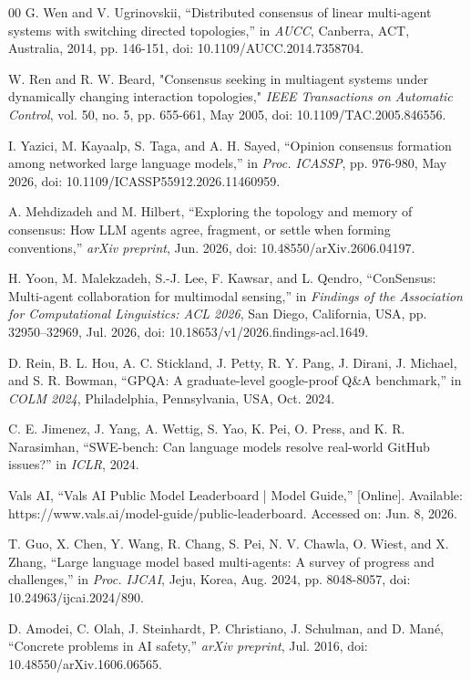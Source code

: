 \documentclass[journal,twoside,web]{ieeecolor_no_firstpage_logo}
\begin{document}
\begin{thebibliography}{00}
 G. Wen and V. Ugrinovskii, “Distributed consensus of linear multi-agent systems with switching directed topologies,” in \textit{AUCC}, Canberra, ACT, Australia, 2014, pp. 146-151, doi: 10.1109/AUCC.2014.7358704.

 W. Ren and R. W. Beard, "Consensus seeking in multiagent systems under dynamically changing interaction topologies," \textit{IEEE Transactions on Automatic Control}, vol. 50, no. 5, pp. 655-661, May 2005, doi: 10.1109/TAC.2005.846556. 

 I. Yazici, M. Kayaalp, S. Taga, and A. H. Sayed, “Opinion consensus formation among networked large language models,” in \textit{Proc. ICASSP}, pp. 976-980, May 2026, doi: 10.1109/ICASSP55912.2026.11460959. 

 A. Mehdizadeh and M. Hilbert, “Exploring the topology and memory of consensus: How LLM agents agree, fragment, or settle when forming conventions,” \textit{arXiv preprint}, Jun. 2026, doi: 10.48550/arXiv.2606.04197.

 H. Yoon, M. Malekzadeh, S.-J. Lee, F. Kawsar, and L. Qendro, “ConSensus: Multi-agent collaboration for multimodal sensing,” in \textit{Findings of the Association for Computational Linguistics: ACL 2026}, San Diego, California, USA, pp. 32950–32969, Jul. 2026, doi: 10.18653/v1/2026.findings-acl.1649.

 D. Rein, B. L. Hou, A. C. Stickland, J. Petty, R. Y. Pang, J. Dirani, J. Michael, and S. R. Bowman, “GPQA: A graduate-level google-proof Q\&A benchmark,” in \textit{COLM 2024}, Philadelphia, Pennsylvania, USA, Oct. 2024.

 C. E. Jimenez, J. Yang, A. Wettig, S. Yao, K. Pei, O. Press, and K. R. Narasimhan, “SWE-bench: Can language models resolve real-world GitHub issues?” in \textit{ICLR}, 2024.

 Vals AI, “Vals AI Public Model Leaderboard | Model Guide,” [Online]. Available: https://www.vals.ai/model-guide/public-leaderboard. Accessed on: Jun. 8, 2026.

 T. Guo, X. Chen, Y. Wang, R. Chang, S. Pei, N. V. Chawla, O. Wiest, and X. Zhang, “Large language model based multi-agents: A survey of progress and challenges,” in \textit{Proc. IJCAI}, Jeju, Korea, Aug. 2024, pp. 8048-8057, doi: 10.24963/ijcai.2024/890.

 D. Amodei, C. Olah, J. Steinhardt, P. Christiano, J. Schulman, and D. Mané, “Concrete problems in AI safety,” \textit{arXiv preprint}, Jul. 2016, doi: 10.48550/arXiv.1606.06565.


\end{thebibliography}
\end{document}
